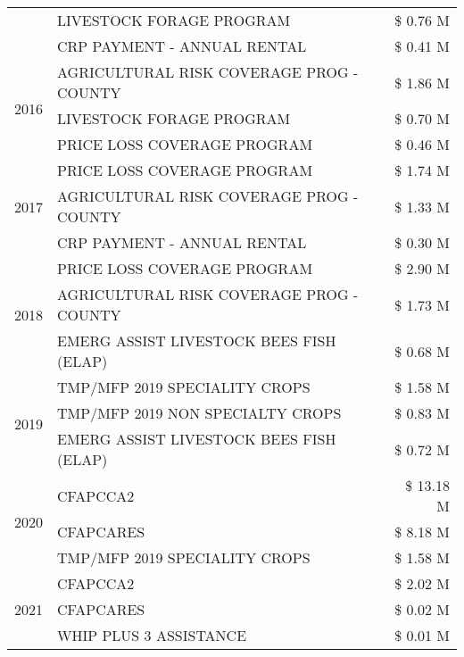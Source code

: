 \begin{tabular}{llr}
 & LIVESTOCK FORAGE PROGRAM & \$ 0.76 M \\
 & CRP PAYMENT - ANNUAL RENTAL & \$ 0.41 M \\
\cline{1-3}
\multirow[t]{3}{*}{2016} & AGRICULTURAL RISK COVERAGE PROG - COUNTY      & \$ 1.86 M \\
 & LIVESTOCK FORAGE PROGRAM                      & \$ 0.70 M \\
 & PRICE LOSS COVERAGE PROGRAM                   & \$ 0.46 M \\
\cline{1-3}
\multirow[t]{3}{*}{2017} & PRICE LOSS COVERAGE PROGRAM & \$ 1.74 M \\
 & AGRICULTURAL RISK COVERAGE PROG - COUNTY & \$ 1.33 M \\
 & CRP PAYMENT - ANNUAL RENTAL & \$ 0.30 M \\
\cline{1-3}
\multirow[t]{3}{*}{2018} & PRICE LOSS COVERAGE PROGRAM & \$ 2.90 M \\
 & AGRICULTURAL RISK COVERAGE PROG - COUNTY & \$ 1.73 M \\
 & EMERG ASSIST LIVESTOCK BEES FISH (ELAP) & \$ 0.68 M \\
\cline{1-3}
\multirow[t]{3}{*}{2019} & TMP/MFP 2019 SPECIALITY CROPS & \$ 1.58 M \\
 & TMP/MFP 2019 NON SPECIALTY CROPS & \$ 0.83 M \\
 & EMERG ASSIST LIVESTOCK BEES FISH (ELAP) & \$ 0.72 M \\
\cline{1-3}
\multirow[t]{3}{*}{2020} & CFAPCCA2 & \$ 13.18 M \\
 & CFAPCARES & \$ 8.18 M \\
 & TMP/MFP 2019 SPECIALITY CROPS & \$ 1.58 M \\
\cline{1-3}
\multirow[t]{3}{*}{2021} & CFAPCCA2 & \$ 2.02 M \\
 & CFAPCARES & \$ 0.02 M \\
 & WHIP PLUS 3 ASSISTANCE & \$ 0.01 M \\
\cline{1-3}
\bottomrule
\end{tabular}
